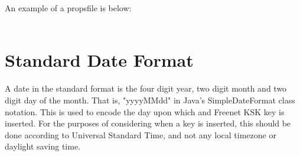 \documentclass[12pt,a4paper]{article}
\begin{document}
An example of a propsfile is below: \\
\\

\section{Standard Date Format}
\label{standard_date}
A date in the standard format is the four digit year, two digit month and two digit day of the month. That is, "yyyyMMdd" in Java's SimpleDateFormat class notation. This is used to encode the day upon which and Freenet KSK key is inserted. For the purposes of considering when a key is inserted, this should be done according to Universal Standard Time, and not any local timezone or daylight saving time.
\end{document}
